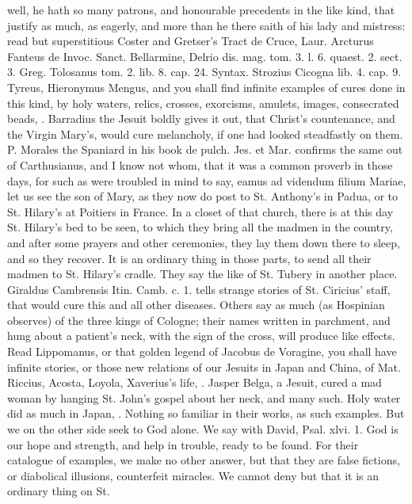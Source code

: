 {well, he hath so many patrons, and honourable precedents in the like
kind, that justify as much, as eagerly, and more than he there saith of
his lady and mistress: read but superstitious Coster and Gretser's
Tract de Cruce, Laur. Arcturus Fanteus de Invoc. Sanct. Bellarmine,
Delrio dis. mag. tom. 3. l. 6. quaest. 2. sect. 3. Greg. Tolosanus tom.
2. lib. 8. cap. 24. Syntax. Strozius Cicogna lib. 4. cap. 9. Tyreus,
Hieronymus Mengus, and you shall find infinite examples of cures done
in this kind, by holy waters, relics, crosses, exorcisms, amulets,
images, consecrated beads, \etc{}. Barradius the Jesuit boldly gives it
out, that Christ's countenance, and the Virgin Mary's, would cure
melancholy, if one had looked steadfastly on them. P. Morales the
Spaniard in his book de pulch. Jes. et Mar. confirms the same out of
Carthusianus, and I know not whom, that it was a common proverb in
those days, for such as were troubled in mind to say, eamus ad videndum
filium Mariae, let us see the son of Mary, as they now do post to St.
Anthony's in Padua, or to St. Hilary's at Poitiers in France.  In
a closet of that church, there is at this day St. Hilary's bed to be
seen, to which they bring all the madmen in the country, and after some
prayers and other ceremonies, they lay them down there to sleep, and so
they recover. It is an ordinary thing in those parts, to send all their
madmen to St. Hilary's cradle. They say the like of St. Tubery in
 another place. Giraldus Cambrensis Itin. Camb. c. 1. tells
strange stories of St. Ciricius' staff, that would cure this and all
other diseases. Others say as much (as Hospinian observes) of the
three kings of Cologne; their names written in parchment, and hung
about a patient's neck, with the sign of the cross, will produce like
effects. Read Lippomanus, or that golden legend of Jacobus de Voragine,
you shall have infinite stories, or those new relations of our
Jesuits in Japan and China, of Mat. Riccius, Acosta, Loyola,
Xaverius's life, \etc{}. Jasper Belga, a Jesuit, cured a mad woman by
hanging St. John's gospel about her neck, and many such. Holy water did
as much in Japan, \etc{}. Nothing so familiar in their works, as such
examples.
But we on the other side seek to God alone. We say with David, Psal.
xlvi. 1. God is our hope and strength, and help in trouble, ready to be
found. For their catalogue of examples, we make no other answer, but
that they are false fictions, or diabolical illusions, counterfeit
miracles. We cannot deny but that it is an ordinary thing on St.
}
